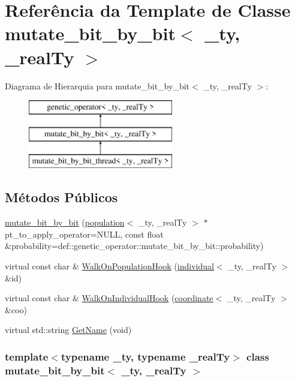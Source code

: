 \hypertarget{classmutate__bit__by__bit}{
\section{Referência da Template de Classe mutate\_\-bit\_\-by\_\-bit$<$ \_\-ty, \_\-realTy $>$}
\label{classmutate__bit__by__bit}
}
Diagrama de Hierarquia para mutate\_\-bit\_\-by\_\-bit$<$ \_\-ty, \_\-realTy $>$:\begin{figure}[H]
\begin{center}
\leavevmode
\includegraphics[height=3cm]{classmutate__bit__by__bit}
\end{center}
\end{figure}
\subsection*{Métodos Públicos}
\begin{DoxyCompactItemize}
\item 
\hyperlink{classmutate__bit__by__bit_a14de7465518021a37cfa7e06e19d02f5}{mutate\_\-bit\_\-by\_\-bit} (\hyperlink{classpopulation}{population}$<$ \_\-ty, \_\-realTy $>$ $\ast$pt\_\-to\_\-apply\_\-operator=NULL, const float \&probability=def::genetic\_\-operator::mutate\_\-bit\_\-by\_\-bit::probability)
\item 
virtual const char \& \hyperlink{classmutate__bit__by__bit_a2f8cc52a35943854f24b7534ecd90c7b}{WalkOnPopulationHook} (\hyperlink{classindividual}{individual}$<$ \_\-ty, \_\-realTy $>$ \&id)
\item 
virtual const char \& \hyperlink{classmutate__bit__by__bit_a150b01e7ee79683012f7d60e8c1b9ccc}{WalkOnIndividualHook} (\hyperlink{classcoordinate}{coordinate}$<$ \_\-ty, \_\-realTy $>$ \&coo)
\item 
virtual std::string \hyperlink{classmutate__bit__by__bit_abdab6da2a2b180f14d71f35c895313a4}{GetName} (void)
\end{DoxyCompactItemize}
\subsubsection*{template$<$typename \_\-ty, typename \_\-realTy$>$ class mutate\_\-bit\_\-by\_\-bit$<$ \_\-ty, \_\-realTy $>$}



